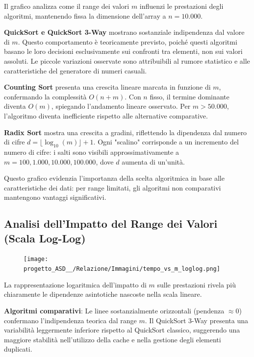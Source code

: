\documentclass[a4paper, 11pt]{article}
\begin{document}
Il grafico analizza come il range dei valori $m$ influenzi le prestazioni degli algoritmi, mantenendo fissa la dimensione dell'array a $n = 10.000$.

\textbf{QuickSort e QuickSort 3-Way} mostrano sostanziale indipendenza dal valore di $m$. Questo comportamento è teoricamente previsto, poiché questi algoritmi basano le loro decisioni esclusivamente sui confronti tra elementi, non sui valori assoluti. Le piccole variazioni osservate sono attribuibili al rumore statistico e alle caratteristiche del generatore di numeri casuali.

\textbf{Counting Sort} presenta una crescita lineare marcata in funzione di $m$, confermando la complessità $O(n + m)$. Con $n$ fisso, il termine dominante diventa $O(m)$, spiegando l'andamento lineare osservato. Per $m > 50.000$, l'algoritmo diventa inefficiente rispetto alle alternative comparative.

\textbf{Radix Sort} mostra una crescita a gradini, riflettendo la dipendenza dal numero di cifre $d = \lfloor \log_{10}(m) \rfloor + 1$. Ogni "scalino" corrisponde a un incremento del numero di cifre: i salti sono visibili approssimativamente a $m = 100, 1.000, 10.000, 100.000$, dove $d$ aumenta di un'unità.

Questo grafico evidenzia l'importanza della scelta algoritmica in base alle caratteristiche dei dati: per range limitati, gli algoritmi non comparativi mantengono vantaggi significativi.

\subsection{Analisi dell'Impatto del Range dei Valori (Scala Log-Log)}
\begin{figure}[H]
\centering
\texttt{[image: progetto\_ASD\_\_/Relazione/Immagini/tempo\_vs\_m\_loglog.png]}
\label{fig:variazione_m}
\end{figure}

La rappresentazione logaritmica dell'impatto di $m$ sulle prestazioni rivela più chiaramente le dipendenze asintotiche nascoste nella scala lineare.

\textbf{Algoritmi comparativi}: Le linee sostanzialmente orizzontali (pendenza $\approx 0$) confermano l'indipendenza teorica dal range $m$. Il QuickSort 3-Way presenta una variabilità leggermente inferiore rispetto al QuickSort classico, suggerendo una maggiore stabilità nell'utilizzo della cache e nella gestione degli elementi duplicati.
\end{document}
